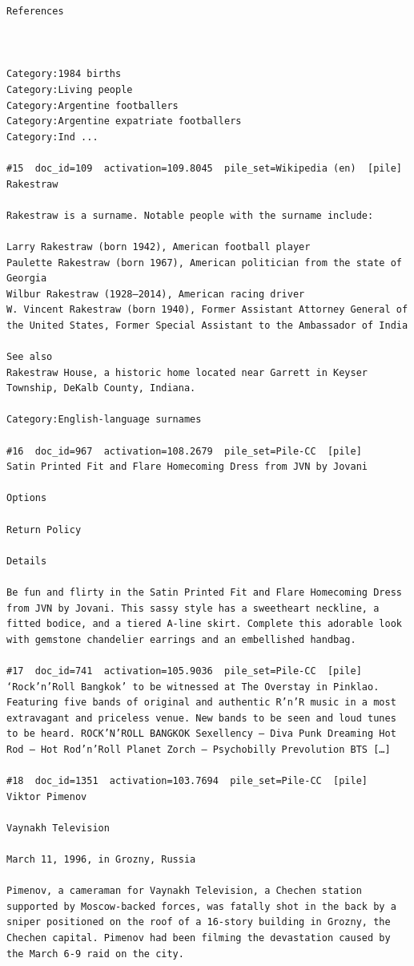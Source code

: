 \begin{verbatim}
References
 
 

Category:1984 births
Category:Living people
Category:Argentine footballers
Category:Argentine expatriate footballers
Category:Ind ...

#15  doc_id=109  activation=109.8045  pile_set=Wikipedia (en)  [pile]
Rakestraw

Rakestraw is a surname. Notable people with the surname include:

Larry Rakestraw (born 1942), American football player
Paulette Rakestraw (born 1967), American politician from the state of Georgia
Wilbur Rakestraw (1928–2014), American racing driver
W. Vincent Rakestraw (born 1940), Former Assistant Attorney General of the United States, Former Special Assistant to the Ambassador of India

See also
Rakestraw House, a historic home located near Garrett in Keyser Township, DeKalb County, Indiana.

Category:English-language surnames

#16  doc_id=967  activation=108.2679  pile_set=Pile-CC  [pile]
Satin Printed Fit and Flare Homecoming Dress from JVN by Jovani

Options

Return Policy

Details

Be fun and flirty in the Satin Printed Fit and Flare Homecoming Dress from JVN by Jovani. This sassy style has a sweetheart neckline, a fitted bodice, and a tiered A-line skirt. Complete this adorable look with gemstone chandelier earrings and an embellished handbag.

#17  doc_id=741  activation=105.9036  pile_set=Pile-CC  [pile]
‘Rock’n’Roll Bangkok’ to be witnessed at The Overstay in Pinklao. Featuring five bands of original and authentic R’n’R music in a most extravagant and priceless venue. New bands to be seen and loud tunes to be heard. ROCK’N’ROLL BANGKOK Sexellency – Diva Punk Dreaming Hot Rod – Hot Rod’n’Roll Planet Zorch – Psychobilly Prevolution BTS […]

#18  doc_id=1351  activation=103.7694  pile_set=Pile-CC  [pile]
Viktor Pimenov

Vaynakh Television

March 11, 1996, in Grozny, Russia

Pimenov, a cameraman for Vaynakh Television, a Chechen station supported by Moscow-backed forces, was fatally shot in the back by a sniper positioned on the roof of a 16-story building in Grozny, the Chechen capital. Pimenov had been filming the devastation caused by the March 6-9 raid on the city.


\end{verbatim}
